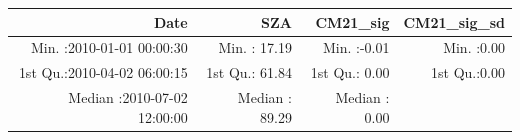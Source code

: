 \documentclass[
  10pt,
  a4paper,oneside]{article}
\begin{document}
\begin{longtable}[]{@{}rrrr@{}}
\toprule
\begin{minipage}[b]{0.34\columnwidth}\raggedleft
Date\strut
\end{minipage} & \begin{minipage}[b]{0.19\columnwidth}\raggedleft
SZA\strut
\end{minipage} & \begin{minipage}[b]{0.18\columnwidth}\raggedleft
CM21\_sig\strut
\end{minipage} & \begin{minipage}[b]{0.18\columnwidth}\raggedleft
CM21\_sig\_sd\strut
\end{minipage}\tabularnewline
\midrule
\endhead
\begin{minipage}[t]{0.34\columnwidth}\raggedleft
Min. :2010-01-01 00:00:30\strut
\end{minipage} & \begin{minipage}[t]{0.19\columnwidth}\raggedleft
Min. : 17.19\strut
\end{minipage} & \begin{minipage}[t]{0.18\columnwidth}\raggedleft
Min. :-0.01\strut
\end{minipage} & \begin{minipage}[t]{0.18\columnwidth}\raggedleft
Min. :0.00\strut
\end{minipage}\tabularnewline
\begin{minipage}[t]{0.34\columnwidth}\raggedleft
1st Qu.:2010-04-02 06:00:15\strut
\end{minipage} & \begin{minipage}[t]{0.19\columnwidth}\raggedleft
1st Qu.: 61.84\strut
\end{minipage} & \begin{minipage}[t]{0.18\columnwidth}\raggedleft
1st Qu.: 0.00\strut
\end{minipage} & \begin{minipage}[t]{0.18\columnwidth}\raggedleft
1st Qu.:0.00\strut
\end{minipage}\tabularnewline
\begin{minipage}[t]{0.34\columnwidth}\raggedleft
Median :2010-07-02 12:00:00\strut
\end{minipage} & \begin{minipage}[t]{0.19\columnwidth}\raggedleft
Median : 89.29\strut
\end{minipage} & \begin{minipage}[t]{0.18\columnwidth}\raggedleft
Median : 0.00\strut
\end{minipage} & \begin{minipage}[t]{0.18\columnwidth}\raggedleft

\end{minipage}
\end{longtable}
\end{document}
